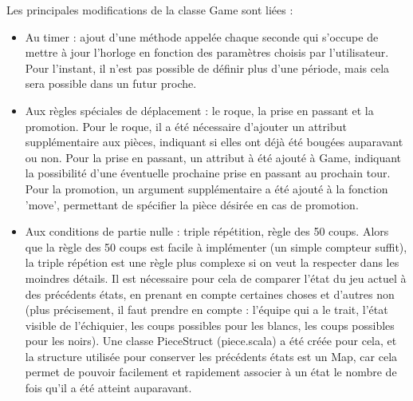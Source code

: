 \documentclass[11pt]{article}
\begin{document}
Les principales modifications de la classe Game sont liées :\newline
\begin{itemize}
\item Au timer : ajout d'une méthode appelée chaque seconde qui s'occupe de mettre à jour l'horloge en fonction des paramètres choisis par l'utilisateur. Pour l'instant, il n'est pas possible de définir plus d'une période, mais cela sera possible dans un futur proche.\newline

\item Aux règles spéciales de déplacement : le roque, la prise en passant et la promotion. Pour le roque, il a été nécessaire d'ajouter un attribut supplémentaire aux pièces, indiquant si elles ont déjà été bougées auparavant ou non. Pour la prise en passant, un attribut à été ajouté à Game, indiquant la possibilité d'une éventuelle prochaine prise en passant au prochain tour. Pour la promotion, un argument supplémentaire a été ajouté à la fonction 'move', permettant de spécifier la pièce désirée en cas de promotion.\newline

\item Aux conditions de partie nulle : triple répétition, règle des 50 coups. Alors que la règle des 50 coups est facile à implémenter (un simple compteur suffit), la triple répétion est une règle plus complexe si on veut la respecter dans les moindres détails. Il est nécessaire pour cela de comparer l'état du jeu actuel à des précédents états, en prenant en compte certaines choses et d'autres non (plus précisement, il faut prendre en compte : l'équipe qui a le trait, l'état visible de l'échiquier, les coups possibles pour les blancs, les coups possibles pour les noirs). Une classe PieceStruct (piece.scala) a été créée pour cela, et la structure utilisée pour conserver les précédents états est un Map, car cela permet de pouvoir facilement et rapidement associer à un état le nombre de fois qu'il a été atteint auparavant.
\end{itemize}
\-
\end{document}

